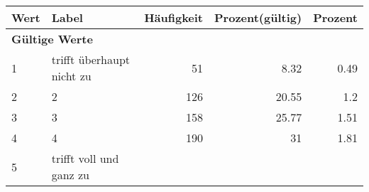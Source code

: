      \begin{longtable}{lXrrr}
     \toprule
     \textbf{Wert} & \textbf{Label} & \textbf{Häufigkeit} & \textbf{Prozent(gültig)} & \textbf{Prozent} \\
     \endhead
     \midrule
     \multicolumn{5}{l}{\textbf{Gültige Werte}}\\

     1 &
     \multicolumn{1}{X}{ trifft überhaupt nicht zu   } &


       \num{51} &
       \num[round-mode=places,round-precision=2]{8.32} &
         \num[round-mode=places,round-precision=2]{0.49} \\

     2 &
     \multicolumn{1}{X}{ 2   } &


       \num{126} &
       \num[round-mode=places,round-precision=2]{20.55} &
         \num[round-mode=places,round-precision=2]{1.2} \\

     3 &
     \multicolumn{1}{X}{ 3   } &


       \num{158} &
       \num[round-mode=places,round-precision=2]{25.77} &
         \num[round-mode=places,round-precision=2]{1.51} \\

     4 &
     \multicolumn{1}{X}{ 4   } &


       \num{190} &
       \num[round-mode=places,round-precision=2]{31} &
         \num[round-mode=places,round-precision=2]{1.81} \\

     5 &
     \multicolumn{1}{X}{ trifft voll und ganz zu   } &



\end{longtable}
